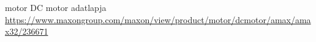 \begin{thebibliography}{9}

\begin{bibitem}{motor}
DC motor adatlapja\\
\url{https://www.maxongroup.com/maxon/view/product/motor/dcmotor/amax/amax32/236671}
\end{bibitem}

\end{thebibliography}
